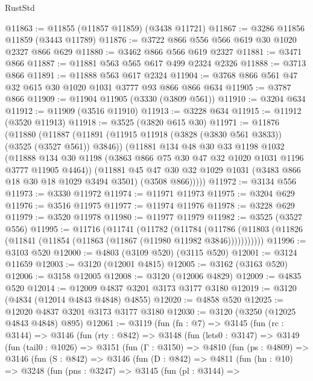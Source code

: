 \begin{lexlean}{RustStd}
\begin{coremodule}
{\begin{coremodule}
{{{{{{{{{{{{{{{{{{{{{{{{{{@11863 := @11855 (@11857 @11859) (@3438 @11721)
@11867 := @3286 @11856 @11859 (@3443 @11789)
@11876 := @3722 @866 @556 @566 @619 @30 @1020 @2327 @866 @629
@11880 := @3462 @866 @566 @619 @2327
@11881 := @3471 @866
@11887 := @11881 @563 @565 @617 @499 @2324 @2326
@11888 := @3713 @866
@11891 := @11888 @563 @617 @2324
@11904 := @3768 @866 @561 @47 @32 @615 @30 @1020 @1031 @3777 @93 @866 @866 @634
@11905 := @3787 @866
@11909 := @11904 @11905 (@3330 (@3809 @561))
@11910 := @3204 @634
@11912 := @11909 (@3516 @11910)
@11913 := @3228 @634
@11915 := @11912 (@3520 @11913)
@11918 := @3525 (@3820 @615 @30)
@11971 := @11876
    (@11880
      (@11887
        (@11891 (@11915 @11918 (@3828 (@3830 @561 @3833)) (@3525 (@3527 @561)) @3846))
        (@11881
          @134
          @48
          @30
          @33
          @1198
          @1032
          (@11888 @134 @30 @1198 (@3863 @866 @75 @30 @47 @32 @1020 @1031 @1196 @3777 @11905 @4464))
          (@11881
            @45
            @47
            @30
            @32
            @1029
            @1031
            (@3483 @866 @18 @30 @18 @1029 @3494 @3501)
            (@3508 @866)))))
@11972 := @3134 @556
@11973 := @3330 @11972
@11974 := @11971 @11973
@11975 := @3204 @629
@11976 := @3516 @11975
@11977 := @11974 @11976
@11978 := @3228 @629
@11979 := @3520 @11978
@11980 := @11977 @11979
@11982 := @3525 (@3527 @556)
@11995 := @11716
    (@11741
      (@11782
        (@11784
          (@11786 (@11803 (@11826 (@11841 (@11854 (@11863 (@11867 (@11980 @11982 @3846)))))))))))
@11996 := @3103 @520
@12000 := @4803 (@3109 @520) (@3115 @520)
@12001 := @3124 @11659
@12003 := @3120 (@12001 @4815)
@12005 := @3162 (@3163 @520)
@12006 := @3158 @12005
@12008 := @3120 (@12006 @4829)
@12009 := @4835 @520
@12014 := @12009 @4837 @3201 @3173 @3177 @3180
@12019 := @3120 (@4834 (@12014 @4843 @4848) @4855)
@12020 := @4858 @520
@12025 := @12020 @4837 @3201 @3173 @3177 @3180
@12030 := @3120 (@3250 (@12025 @4843 @4848) @895)
@12061 := @3119
    (fun (fn : @7) =>
    @3145
      (fun (rc : @3144) =>
      @3146
        (fun (rty : @842) =>
        @3148
          (fun (lets0 : @3147) =>
          @3149
            (fun (tail0 : @1026) =>
            @3151
              (fun (Γ : @3150) =>
              @4810
                (fun (ps : @4809) =>
                @3146
                  (fun (S : @842) =>
                  @3146
                    (fun (D : @842) =>
                    @4811
                      (fun (hn : @10) =>
                      @3248
                        (fun (pns : @3247) =>
                        @3145
                          (fun (pl : @3144) =>
}}}}}}}}}}}}}}}}}}}}}}}}}}
\end{coremodule}}
\end{coremodule}
\end{lexlean}
